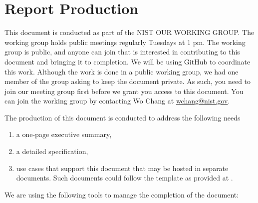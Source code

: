 
\newcommand{\WG}{OUR WORKING GROUP}

\section*{Report Production}


This document is conducted as part of the NIST \WG. The working group
holds public meetings regularly Tuesdays at 1 pm. The
working group is public, and anyone can join that is interested in
contributing to this document and bringing it to completion. We will
be using GitHub to coordinate this work. Although the work is done in
a public working group, we had one member of the group asking to keep
the document private. As such, you need to join our meeting group first
before we grant you access to this document. You can join the working
group by contacting Wo Chang at \href{mailto:wchang@nist.gov}{wchang@nist.gov}.


The production of this document is conducted to address the following
needs

\begin{enumerate}
  \item a one-page executive summary, 

  \item a detailed specification,

  \item use cases that support this document that may be hosted in
    separate documents. Such documents could follow the template as
    provided at \cite{nist-bigdatawg}.

\end{enumerate}


\parindent0pt We are using the following tools to manage the completion of
the document:

